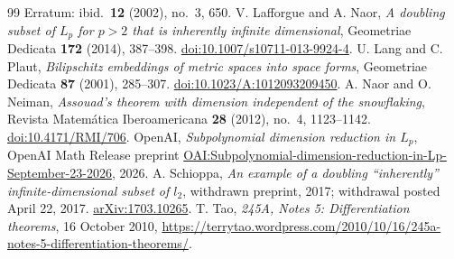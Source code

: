 \documentclass[11pt]{article}
\begin{document}
\begin{thebibliography}{99}
Erratum: ibid.\ \textbf{12} (2002), no.~3, 650.
V. Lafforgue and A. Naor, \emph{A doubling subset of $L_p$ for $p>2$ that is inherently infinite dimensional},
Geometriae Dedicata \textbf{172} (2014), 387--398.
\href{https://doi.org/10.1007/s10711-013-9924-4}{doi:10.1007/s10711-013-9924-4}.
U. Lang and C. Plaut, \emph{Bilipschitz embeddings of metric spaces into space forms},
Geometriae Dedicata \textbf{87} (2001), 285--307.
\href{https://doi.org/10.1023/A:1012093209450}{doi:10.1023/A:1012093209450}.
A. Naor and O. Neiman, \emph{Assouad's theorem with dimension independent of the snowflaking},
Revista Matem\'atica Iberoamericana \textbf{28} (2012), no.~4, 1123--1142.
\href{https://doi.org/10.4171/RMI/706}{doi:10.4171/RMI/706}.
OpenAI, \emph{Subpolynomial dimension reduction in $L_p$},
OpenAI Math Release preprint
\href{https://github.com/openai/math/blob/main/preprints/Subpolynomial-dimension-reduction-in-Lp-September-23-2026/paper.pdf}{OAI:Subpolynomial-dimension-reduction-in-Lp-September-23-2026},
2026.
A. Schioppa, \emph{An example of a doubling ``inherently'' infinite-dimensional subset of $l_2$},
withdrawn preprint, 2017; withdrawal posted April 22, 2017.
\href{https://arxiv.org/abs/1703.10265}{arXiv:1703.10265}.
T. Tao, \emph{245A, Notes 5: Differentiation theorems}, 16 October 2010,
\url{https://terrytao.wordpress.com/2010/10/16/245a-notes-5-differentiation-theorems/}.
\end{thebibliography}
\end{document}
